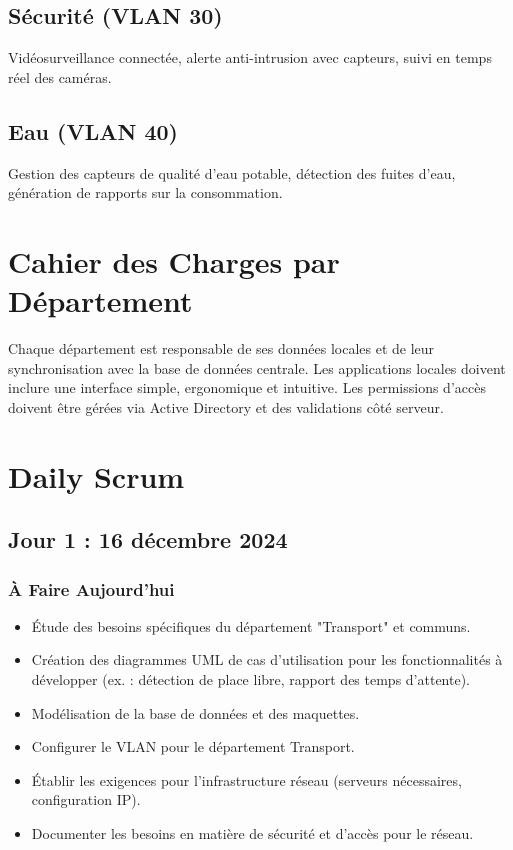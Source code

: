 \documentclass[a4paper,12pt]{report}
\begin{document}
\section{Sécurité (VLAN 30)}
Vidéosurveillance connectée, alerte anti-intrusion avec capteurs, suivi en temps réel des caméras.

\section{Eau (VLAN 40)}
Gestion des capteurs de qualité d'eau potable, détection des fuites d'eau, génération de rapports sur la consommation.

\chapter{Cahier des Charges par Département}
Chaque département est responsable de ses données locales et de leur synchronisation avec la base de données centrale. Les applications locales doivent inclure une interface simple, ergonomique et intuitive. Les permissions d'accès doivent être gérées via Active Directory et des validations côté serveur.

\chapter{Daily Scrum}

\section{Jour 1 : 16 décembre 2024}

\subsection{À Faire Aujourd'hui}
\begin{itemize}
    \item Étude des besoins spécifiques du département "Transport" et communs.
    \item Création des diagrammes UML de cas d'utilisation pour les fonctionnalités à développer (ex. : détection de place libre, rapport des temps d'attente).
    \item Modélisation de la base de données et des maquettes.
    \item Configurer le VLAN pour le département Transport.
    \item Établir les exigences pour l'infrastructure réseau (serveurs nécessaires, configuration IP).
    \item Documenter les besoins en matière de sécurité et d'accès pour le réseau.
\end{itemize}
\end{document}
